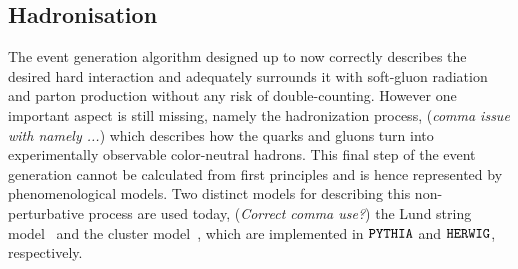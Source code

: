 
\subsection{Hadronisation} \label{sec::Hadronisation}
The event generation algorithm designed up to now correctly describes the desired hard interaction and adequately surrounds it with soft-gluon radiation and parton production without any risk of double-counting. However one important aspect is still missing, namely the hadronization process, (\textit{comma issue with namely ...}) which describes how the quarks and gluons turn into experimentally observable color-neutral hadrons.
This final step of the event generation cannot be calculated from first principles and is hence represented by phenomenological models.
Two distinct models for describing this non-perturbative process are used today, (\textit{Correct comma use?}) the Lund string model~\cite{Lund} and the cluster model~\cite{ClusterModel}, which are implemented in $\texttt{PYTHIA}$ and $\texttt{HERWIG}$, respectively.

